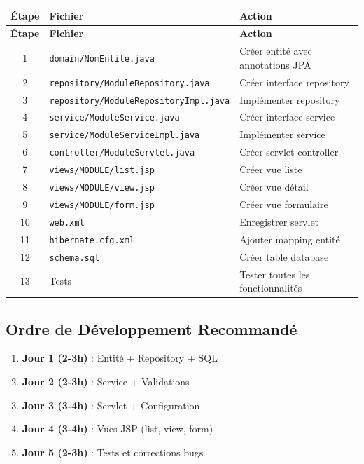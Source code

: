 \documentclass[12pt,a4paper]{article}
\begin{document}
\begin{longtable}{|c|l|l|}
\hline
\textbf{Étape} & \textbf{Fichier} & \textbf{Action} \\
\hline
\endfirsthead
\hline
\textbf{Étape} & \textbf{Fichier} & \textbf{Action} \\
\hline
\endhead
1 & \texttt{domain/NomEntite.java} & Créer entité avec annotations JPA \\
\hline
2 & \texttt{repository/ModuleRepository.java} & Créer interface repository \\
\hline
3 & \texttt{repository/ModuleRepositoryImpl.java} & Implémenter repository \\
\hline
4 & \texttt{service/ModuleService.java} & Créer interface service \\
\hline
5 & \texttt{service/ModuleServiceImpl.java} & Implémenter service \\
\hline
6 & \texttt{controller/ModuleServlet.java} & Créer servlet controller \\
\hline
7 & \texttt{views/MODULE/list.jsp} & Créer vue liste \\
\hline
8 & \texttt{views/MODULE/view.jsp} & Créer vue détail \\
\hline
9 & \texttt{views/MODULE/form.jsp} & Créer vue formulaire \\
\hline
10 & \texttt{web.xml} & Enregistrer servlet \\
\hline
11 & \texttt{hibernate.cfg.xml} & Ajouter mapping entité \\
\hline
12 & \texttt{schema.sql} & Créer table database \\
\hline
13 & Tests & Tester toutes les fonctionnalités \\
\hline
\end{longtable}

\subsection{Ordre de Développement Recommandé}

\begin{enumerate}
    \item \textbf{Jour 1 (2-3h)} : Entité + Repository + SQL
    \item \textbf{Jour 2 (2-3h)} : Service + Validations
    \item \textbf{Jour 3 (3-4h)} : Servlet + Configuration
    \item \textbf{Jour 4 (3-4h)} : Vues JSP (list, view, form)
    \item \textbf{Jour 5 (2-3h)} : Tests et corrections bugs
\end{enumerate}
\end{document}
